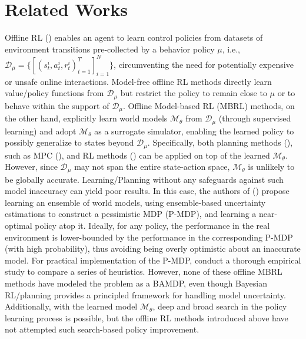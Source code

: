 \section{Related Works} \label{rel_works}

Offline RL (\cite{DBLP:journals/corr/abs-2005-01643, DBLP:journals/corr/abs-2402-13777}) enables an agent to learn control policies from datasets of environment transitions pre-collected by a behavior policy $\mu$, i.e., $\mathcal{D}_\mu = \{[(s_t^i, a_t^i, r_t^i)_{t=1}^T]_{i=1}^N\}$, circumventing the need for potentially expensive or unsafe online interactions. Model-free offline RL methods directly learn value/policy functions from \(\mathcal{D}_\mu\) but restrict the policy to remain close to \(\mu\) or to behave within the support of \(\mathcal{D}_\mu\). Offline Model-based RL (MBRL) methods, on the other hand, explicitly learn world models $\mathcal{M}_\theta$ from $\mathcal{D}_\mu$ (through supervised learning) and adopt $\mathcal{M}_\theta$ as a surrogate simulator, enabling the learned policy to possibly generalize to states beyond $\mathcal{D}_\mu$. Specifically, both planning methods (\cite{DBLP:conf/iclr/ArgensonD21, DBLP:conf/ijcai/ZhanZX22, DBLP:journals/ral/DiehlSKHB23}), such as MPC (\cite{garcia1989model}), and RL methods (\cite{DBLP:conf/nips/YuTYEZLFM20, DBLP:conf/nips/KidambiRNJ20, DBLP:conf/iclr/LuBPOR22, DBLP:conf/nips/YuKRRLF21, DBLP:conf/nips/GuoSG22}) can be applied on top of the learned $\mathcal{M}_\theta$. However, since $\mathcal{D}_\mu$ may not span the entire state-action space, $\mathcal{M}_\theta$ is unlikely to be globally accurate. Learning/Planning without any safeguards against such model inaccuracy can yield poor results. In this case, the authors of (\cite{DBLP:conf/nips/YuTYEZLFM20, DBLP:conf/nips/KidambiRNJ20, DBLP:conf/iclr/LuBPOR22}) propose learning an ensemble of world models, using ensemble-based uncertainty estimations to construct a pessimistic MDP (P-MDP), and learning a near-optimal policy atop it. Ideally, for any policy, the performance in the real environment is lower-bounded by the performance in the corresponding P-MDP (with high probability), thus avoiding being overly optimistic about an inaccurate model. For practical implementation of the P-MDP, \cite{DBLP:conf/iclr/LuBPOR22} conduct a thorough empirical study to compare a series of heuristics. However, none of these offline MBRL methods have modeled the problem as a BAMDP, even though Bayesian RL/planning provides a principled framework for handling model uncertainty. Additionally, with the learned model \(\mathcal{M}_\theta\), deep and broad search in the policy learning process is possible, but the offline RL methods introduced above have not attempted such search-based policy improvement.

